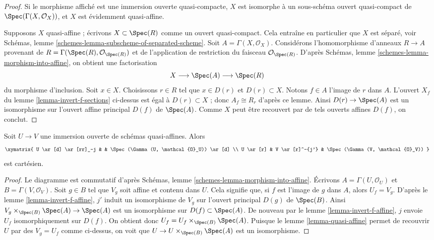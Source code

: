\begin{proof}
Si le morphisme affiché est une immersion ouverte quasi-compacte,
$X$ est isomorphe à un sous-schéma ouvert quasi-compact de
$\Spec(\Gamma(X, \mathcal{O}_X))$, et $X$ est évidemment quasi-affine.

\medskip\noindent
Supposons $X$ quasi-affine ; écrivons $X \subset \Spec(R)$ comme
un ouvert quasi-compact. Cela entraîne en particulier que $X$ est
séparé, voir
Schémas, lemme \ref{schemes-lemma-subscheme-of-separated-scheme}.
Soit $A = \Gamma(X, \mathcal{O}_X)$.
Considérons l'homomorphisme d'anneaux $R \to A$ provenant de
$R = \Gamma(\Spec(R), \mathcal{O}_{\Spec(R)})$
et de l'application de restriction du faisceau $\mathcal{O}_{\Spec(R)}$.
D'après Schémas, lemme \ref{schemes-lemma-morphism-into-affine},
on obtient une factorisation
$$
X \longrightarrow
\Spec(A) \longrightarrow
\Spec(R)
$$
du morphisme d'inclusion. Soit $x \in X$. Choisissons $r \in R$ tel que
$x \in D(r)$ et $D(r) \subset X$. Notons $f \in A$ l'image de $r$
dans $A$. L'ouvert $X_f$ du lemme \ref{lemma-invert-f-sections}
ci-dessus est égal à $D(r) \subset X$ ; donc $A_f \cong R_r$ d'après
ce lemme.
Ainsi $D(r) \to \Spec(A)$ est un isomorphisme sur
l'ouvert affine principal $D(f)$ de $\Spec(A)$. Comme $X$
peut être recouvert par de tels ouverts affines $D(f)$, on conclut.
\end{proof}

\begin{lemma}
\label{lemma-cartesian-diagram-quasi-affine}
Soit $U \to V$ une immersion ouverte de schémas quasi-affines. Alors
$$
\xymatrix{
U \ar[d] \ar[rr]_-j & & \Spec(\Gamma(U, \mathcal{O}_U)) \ar[d] \\
U \ar[r] & V \ar[r]^-{j'} & \Spec(\Gamma(V, \mathcal{O}_V))
}
$$
est cartésien.
\end{lemma}

\begin{proof}
Le diagramme est commutatif d'après Schémas, lemme
\ref{schemes-lemma-morphism-into-affine}.
Écrivons $A = \Gamma(U, \mathcal{O}_U)$ et $B = \Gamma(V, \mathcal{O}_V)$. Soit
$g \in B$ tel que $V_g$ soit affine et contenu dans $U$. Cela
signifie que, si $f$ est l'image de $g$ dans $A$, alors $U_f = V_g$. D'après le lemme
\ref{lemma-invert-f-affine}, $j'$ induit un isomorphisme de
$V_g$ sur l'ouvert principal $D(g)$ de $\Spec(B)$. Ainsi
$V_g \times_{\Spec(B)} \Spec(A) \to \Spec(A)$ est
un isomorphisme sur $D(f) \subset \Spec(A)$. De nouveau par le lemme \ref{lemma-invert-f-affine},
$j$ envoie $U_f$ isomorphiquement sur $D(f)$. On obtient donc
$U_f = U_f \times_{\Spec(B)} \Spec(A)$. Puisque le
lemme \ref{lemma-quasi-affine} permet de recouvrir $U$ par des $V_g = U_f$ comme
ci-dessus, on voit que $U \to U \times_{\Spec(B)} \Spec(A)$ est un isomorphisme.
\end{proof}

